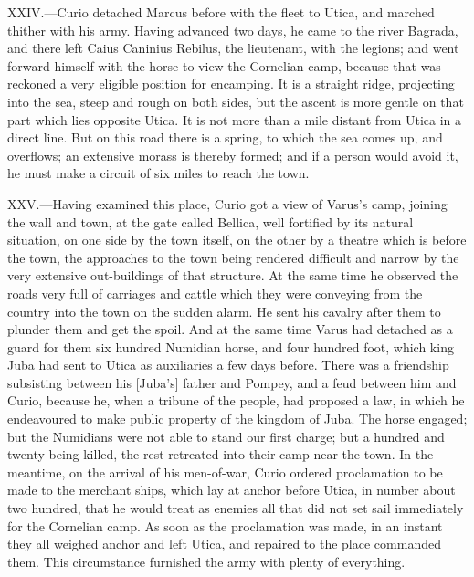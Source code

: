 XXIV.—Curio detached Marcus before with the fleet to Utica, and marched
thither with his army. Having advanced two days, he came to the river
Bagrada, and there left Caius Caninius Rebilus, the lieutenant, with the
legions; and went forward himself with the horse to view the Cornelian
camp, because that was reckoned a very eligible position for encamping.
It is a straight ridge, projecting into the sea, steep and rough on both
sides, but the ascent is more gentle on that part which lies opposite
Utica. It is not more than a mile distant from Utica in a direct line.
But on this road there is a spring, to which the sea comes up, and
overflows; an extensive morass is thereby formed; and if a person would
avoid it, he must make a circuit of six miles to reach the town.

XXV.—Having examined this place, Curio got a view of Varus's camp,
joining the wall and town, at the gate called Bellica, well fortified by
its natural situation, on one side by the town itself, on the other by a
theatre which is before the town, the approaches to the town being
rendered difficult and narrow by the very extensive out-buildings of
that structure. At the same time he observed the roads very full of
carriages and cattle which they were conveying from the country into the
town on the sudden alarm. He sent his cavalry after them to plunder them
and get the spoil. And at the same time Varus had detached as a guard
for them six hundred Numidian horse, and four hundred foot, which king
Juba had sent to Utica as auxiliaries a few days before. There was a
friendship subsisting between his [Juba's] father and Pompey, and a feud
between him and Curio, because he, when a tribune of the people, had
proposed a law, in which he endeavoured to make public property of the
kingdom of Juba. The horse engaged; but the Numidians were not able to
stand our first charge; but a hundred and twenty being killed, the rest
retreated into their camp near the town. In the meantime, on the arrival
of his men-of-war, Curio ordered proclamation to be made to the merchant
ships, which lay at anchor before Utica, in number about two hundred,
that he would treat as enemies all that did not set sail immediately for
the Cornelian camp. As soon as the proclamation was made, in an instant
they all weighed anchor and left Utica, and repaired to the place
commanded them. This circumstance furnished the army with plenty of
everything.

